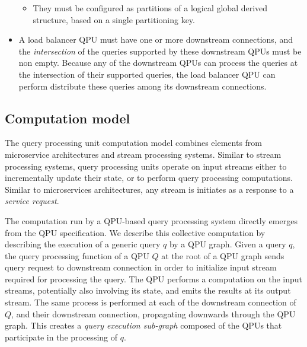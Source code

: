 \begin{itemize}
\begin{itemize}
    \item They must be configured as partitions of a logical global derived structure, based on a single partitioning key.
  \end{itemize}

  \item A load balancer QPU must have one or more downstream connections, and the \textit{intersection} of the queries
  supported by these downstream QPUs must be non empty.
  Because any of the downstream QPUs can process the queries at the intersection of their supported queries, the load
  balancer QPU can perform distribute these queries among its downstream connections.
\end{itemize}

\subsection{Computation model}
\label{sec:computation_model}


The query processing unit computation model combines elements from microservice architectures and stream processing systems.
Similar to stream processing systems,
query processing units operate on input streams either to incrementally update their state, or to perform query processing
computations.
Similar to microservices architectures, any stream is initiates as a response to a \textit{service request}.

\medskip

The computation run by a QPU-based query processing system directly emerges from the QPU specification.
We describe this collective computation by describing the execution of a generic query $q$ by a QPU graph.
Given a query $q$, the query processing function of a QPU $Q$ at the root of a QPU graph sends query request to
downstream connection in order to initialize input stream required for processing the query.
The QPU performs a computation on the input streams, potentially also involving its state, and emits the results at its
output stream.
The same process is performed at each of the downstream connection of $Q$, and their downstream connection, propagating
downwards through the QPU graph.
This creates a \textit{query execution sub-graph} composed of the QPUs that participate in the processing of $q$.

